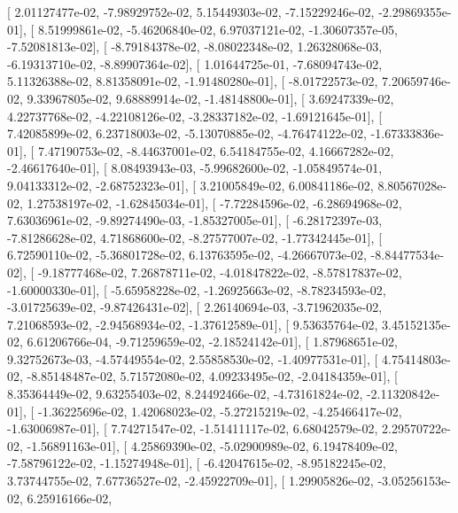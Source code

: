 \documentclass{article}
\begin{document}
       [  2.01127477e-02,  -7.98929752e-02,   5.15449303e-02,
         -7.15229246e-02,  -2.29869355e-01],
       [  8.51999861e-02,  -5.46206840e-02,   6.97037121e-02,
         -1.30607357e-05,  -7.52081813e-02],
       [ -8.79184378e-02,  -8.08022348e-02,   1.26328068e-03,
         -6.19313710e-02,  -8.89907364e-02],
       [  1.01644725e-01,  -7.68094743e-02,   5.11326388e-02,
          8.81358091e-02,  -1.91480280e-01],
       [ -8.01722573e-02,   7.20659746e-02,   9.33967805e-02,
          9.68889914e-02,  -1.48148800e-01],
       [  3.69247339e-02,   4.22737768e-02,  -4.22108126e-02,
         -3.28337182e-02,  -1.69121645e-01],
       [  7.42085899e-02,   6.23718003e-02,  -5.13070885e-02,
         -4.76474122e-02,  -1.67333836e-01],
       [  7.47190753e-02,  -8.44637001e-02,   6.54184755e-02,
          4.16667282e-02,  -2.46617640e-01],
       [  8.08493943e-03,  -5.99682600e-02,  -1.05849574e-01,
          9.04133312e-02,  -2.68752323e-01],
       [  3.21005849e-02,   6.00841186e-02,   8.80567028e-02,
          1.27538197e-02,  -1.62845034e-01],
       [ -7.72284596e-02,  -6.28694968e-02,   7.63036961e-02,
         -9.89274490e-03,  -1.85327005e-01],
       [ -6.28172397e-03,  -7.81286628e-02,   4.71868600e-02,
         -8.27577007e-02,  -1.77342445e-01],
       [  6.72590110e-02,  -5.36801728e-02,   6.13763595e-02,
         -4.26667073e-02,  -8.84477534e-02],
       [ -9.18777468e-02,   7.26878711e-02,  -4.01847822e-02,
         -8.57817837e-02,  -1.60000330e-01],
       [ -5.65958228e-02,  -1.26925663e-02,  -8.78234593e-02,
         -3.01725639e-02,  -9.87426431e-02],
       [  2.26140694e-03,  -3.71962035e-02,   7.21068593e-02,
         -2.94568934e-02,  -1.37612589e-01],
       [  9.53635764e-02,   3.45152135e-02,   6.61206766e-04,
         -9.71259659e-02,  -2.18524142e-01],
       [  1.87968651e-02,   9.32752673e-03,  -4.57449554e-02,
          2.55858530e-02,  -1.40977531e-01],
       [  4.75414803e-02,  -8.85148487e-02,   5.71572080e-02,
          4.09233495e-02,  -2.04184359e-01],
       [  8.35364449e-02,   9.63255403e-02,   8.24492466e-02,
         -4.73161824e-02,  -2.11320842e-01],
       [ -1.36225696e-02,   1.42068023e-02,  -5.27215219e-02,
         -4.25466417e-02,  -1.63006987e-01],
       [  7.74271547e-02,  -1.51411117e-02,   6.68042579e-02,
          2.29570722e-02,  -1.56891163e-01],
       [  4.25869390e-02,  -5.02900989e-02,   6.19478409e-02,
         -7.58796122e-02,  -1.15274948e-01],
       [ -6.42047615e-02,  -8.95182245e-02,   3.73744755e-02,
          7.67736527e-02,  -2.45922709e-01],
       [  1.29905826e-02,  -3.05256153e-02,   6.25916166e-02,
\end{document}
